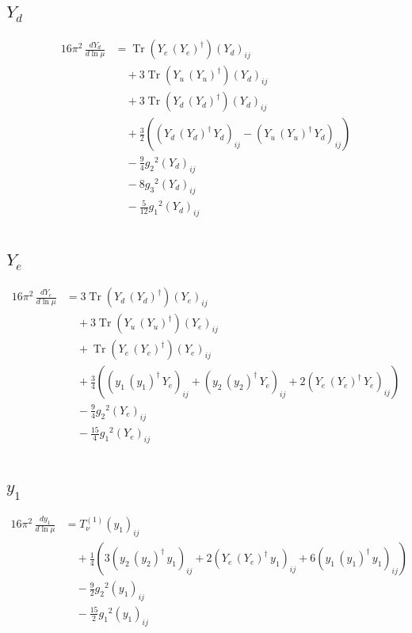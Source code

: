\documentclass[10pt,a4paper]{article}
\begin{document}
\subsection*{$Y_d$}
\begin{align*}
16\pi^2\,\frac{d Y_d}{d\ln\mu} &=\operatorname{Tr}\!\left({Y_e}\,\left({Y_e}\right)^{\dagger}\right) \left({Y_d}\right)_{ij} \\
&\quad +3 \operatorname{Tr}\!\left({Y_u}\,\left({Y_u}\right)^{\dagger}\right) \left({Y_d}\right)_{ij} \\
&\quad +3 \operatorname{Tr}\!\left({Y_d}\,\left({Y_d}\right)^{\dagger}\right) \left({Y_d}\right)_{ij} \\
&\quad +\frac{3}{2} (\left({Y_d}\,\left({Y_d}\right)^{\dagger}\,{Y_d}\right)_{ij}-\left({Y_u}\,\left({Y_u}\right)^{\dagger}\,{Y_d}\right)_{ij}) \\
&\quad -\frac{9}{4} {g_2}^2 \left({Y_d}\right)_{ij} \\
&\quad -8 {g_3}^2 \left({Y_d}\right)_{ij} \\
&\quad -\frac{5}{12} {g_1}^2 \left({Y_d}\right)_{ij} \\
\end{align*}
\subsection*{$Y_e$}
\begin{align*}
16\pi^2\,\frac{d Y_e}{d\ln\mu} &=3 \operatorname{Tr}\!\left({Y_d}\,\left({Y_d}\right)^{\dagger}\right) \left({Y_e}\right)_{ij} \\
&\quad +3 \operatorname{Tr}\!\left({Y_u}\,\left({Y_u}\right)^{\dagger}\right) \left({Y_e}\right)_{ij} \\
&\quad +\operatorname{Tr}\!\left({Y_e}\,\left({Y_e}\right)^{\dagger}\right) \left({Y_e}\right)_{ij} \\
&\quad +\frac{3}{4} (\left({y_1}\,\left({y_1}\right)^{\dagger}\,{Y_e}\right)_{ij}+\left({y_2}\,\left({y_2}\right)^{\dagger}\,{Y_e}\right)_{ij}+2 \left({Y_e}\,\left({Y_e}\right)^{\dagger}\,{Y_e}\right)_{ij}) \\
&\quad -\frac{9}{4} {g_2}^2 \left({Y_e}\right)_{ij} \\
&\quad -\frac{15}{4} {g_1}^2 \left({Y_e}\right)_{ij} \\
\end{align*}
\subsection*{$y_1$}
\begin{align*}
16\pi^2\,\frac{d y_1}{d\ln\mu} &=T_{\nu}^{(1)} \left({y_1}\right)_{ij} \\
&\quad +\frac{1}{4} (3 \left({y_2}\,\left({y_2}\right)^{\dagger}\,{y_1}\right)_{ij}+2 \left({Y_e}\,\left({Y_e}\right)^{\dagger}\,{y_1}\right)_{ij}+6 \left({y_1}\,\left({y_1}\right)^{\dagger}\,{y_1}\right)_{ij}) \\
&\quad -\frac{9}{2} {g_2}^2 \left({y_1}\right)_{ij} \\
&\quad -\frac{15}{2} {g_1}^2 \left({y_1}\right)_{ij} \\
\end{align*}
\end{document}
